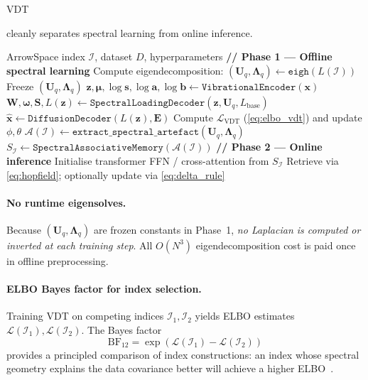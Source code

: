 \documentclass[11pt,a4paper]{article}
\newcommand{\I}{\mathcal{I}}
\newcommand{\A}{\mathcal{A}}
\newcommand{\elbo}{\mathcal{L}}
\newcommand{\bLambda}{\bm{\Lambda}}
\newcommand{\bU}{\bm{U}}
\newcommand{\bS}{\bm{S}}
\newcommand{\bW}{\bm{W}}
\newcommand{\bz}{\bm{z}}
\newcommand{\bmu}{\bm{\mu}}
\newcommand{\bomega}{\bm{\omega}}
\newcommand{\bx}{\bm{x}}
\newcommand{\bE}{\bm{E}}
\begin{document}
VDT{cleanly separates spectral learning from online inference.

\begin{algorithm}[h]
\caption{VDT Two-Phase Procedure}
\label{alg:two_phase}
\begin{algorithmic}[1]
\Require ArrowSpace index $\I$, dataset $D$, hyperparameters
\State \textbf{// Phase 1 --- Offline spectral learning}
\State Compute eigendecomposition: $(\bU_q,\bLambda_q)\leftarrow\texttt{eigh}(L(\I))$ 
\State Freeze $(\bU_q,\bLambda_q)$
  \State $\bz,\bmu,\log\bm{s},\log\bm{a},\log\bm{b}\leftarrow\texttt{VibrationalEncoder}(\bx)$
  \State $\bW,\bomega,\bS,L(\bz)\leftarrow\texttt{SpectralLoadingDecoder}(\bz,\bU_q,L_{\mathrm{base}})$
  \State $\hat{\bx}\leftarrow\texttt{DiffusionDecoder}(L(\bz),\bE)$
  \State Compute $\mathcal{L}_{\mathrm{VDT}}$ (\cref{eq:elbo_vdt}) and update $\phi,\theta$
\EndFor
\State $\A(\I)\leftarrow\texttt{extract\_spectral\_artefact}(\bU_q,\bLambda_q)$
\State $S_{\I}\leftarrow\texttt{SpectralAssociativeMemory}(\A(\I))$
\State \textbf{// Phase 2 --- Online inference}
\State Initialise transformer FFN / cross-attention from $S_{\I}$
  \State Retrieve via \cref{eq:hopfield}; optionally update via \cref{eq:delta_rule}
\EndFor
\end{algorithmic}
\end{algorithm}

\paragraph{No runtime eigensolves.}
Because $(\bU_q,\bLambda_q)$ are frozen constants in Phase~1, \emph{no
Laplacian is computed or inverted at each training step}.  All $O(N^3)$
eigendecomposition cost is paid once in offline preprocessing.

\paragraph{ELBO Bayes factor for index selection.}
Training VDT on competing indices $\I_1, \I_2$ yields ELBO estimates
$\elbo(\I_1),\elbo(\I_2)$.  The Bayes factor
\begin{equation}
  \mathrm{BF}_{12} = \exp(\elbo(\I_1) - \elbo(\I_2))
  \label{eq:bayes_factor}
\end{equation}
provides a principled comparison of index constructions: an index whose
spectral geometry explains the data covariance better will achieve a higher
ELBO~\citep{lotfi2022marginal}.

}
\end{document}
